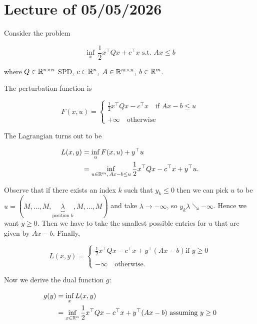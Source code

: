 \chapter{Lecture \thechapter{} of 05/05/2026}

\begin{example}

    Consider the problem 

    \[ \inf_x\, \frac12 x^\top Q x + c^\top x \text{ s.t. } Ax \le b \]

    where $Q \in \mathbb{R}^{n \times n}$ SPD, $c \in {\mathbb{R}^n}$, $A \in \mathbb{R}^{m \times n}$, $b \in \mathbb{R}^m$.

    The perturbation function is 

    \[ F(x,u) = 
        \begin{cases}
            \frac12 x^\top Q x - c^\top x \quad \text{if } Ax-b \le u \\
            \\
            +\infty \quad \text{otherwise}
        \end{cases}
    \]

    The Lagrangian turns out to be 

    \begin{align*}
        L(x,y) &= \inf_u F(x,u) + y^\top u \\
            &= \inf_{u \in \mathbb{R}^m,\, Ax - b \le u} \frac12 x^\top Q x - c^\top x + y^\top u.
    \end{align*}

    Observe that if there exists an index $k$ such that $y_k \le 0$ then we can pick $u$ to be $u = (M,\dots,M, \underbrace{\lambda}_{\text{position } k}, M, \dots, M)$ and take $\lambda \to -\infty$, so $y_k\lambda \searrow -\infty$. Hence we want $y \ge 0$. Then we have to take the smallest possible entries for $u$ that are given by $Ax - b$. Finally, 

    \[ L(x,y) = 
        \begin{cases}
            \frac12 x^\top Q x - c^\top x + y^\top (Ax-b) \text{if } y \ge 0 \\
            \\
            -\infty \quad\text{otherwise}.
        \end{cases}
    \]

    Now we derive the dual function $g$: 

    \begin{align*}
        g(y) &= \inf_x L(x,y) \\
            &= \inf_{x \in {\mathbb{R}^n}} \frac12 x^\top Q x - c^\top x + y^\top (Ax - b) \text{ assuming } y \ge 0
    \end{align*}


\end{example}
